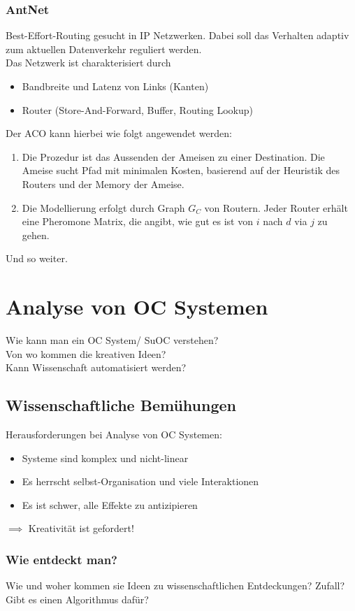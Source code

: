 \documentclass[a4paper]{article}
\begin{document}
\subsubsection{AntNet}
Best-Effort-Routing gesucht in IP Netzwerken. Dabei soll das Verhalten adaptiv zum aktuellen Datenverkehr reguliert werden.\\

Das Netzwerk ist charakterisiert durch
\begin{itemize}
	\item Bandbreite und Latenz von Links (Kanten)
	\item Router (Store-And-Forward, Buffer, Routing Lookup)
\end{itemize}
Der ACO kann hierbei wie folgt angewendet werden:
\begin{enumerate}
	\item Die Prozedur ist das Aussenden der Ameisen zu einer Destination. Die Ameise sucht Pfad mit minimalen Kosten, basierend auf der Heuristik des Routers und der Memory der Ameise.
	\item Die Modellierung erfolgt durch Graph $G_C$ von Routern. Jeder Router erhält eine Pheromone Matrix, die angibt, wie gut es ist von $i$ nach $d$ via $j$ zu gehen.
\end{enumerate}
Und so weiter.
\newpage

\section{Analyse von OC Systemen}
Wie kann man ein OC System/ SuOC verstehen?\\
Von wo kommen die kreativen Ideen?\\
Kann Wissenschaft automatisiert werden?
\subsection{Wissenschaftliche Bemühungen}
Herausforderungen bei Analyse von OC Systemen:
\begin{itemize}
	\item Systeme sind komplex und nicht-linear
	\item Es herrscht selbst-Organisation und viele Interaktionen
	\item Es ist schwer, alle Effekte zu antizipieren
\end{itemize}
$\implies$ Kreativität ist gefordert!\\

\subsubsection{Wie entdeckt man?}
Wie und woher kommen sie Ideen zu wissenschaftlichen Entdeckungen? Zufall? Gibt es einen Algorithmus dafür?\\
\end{document}
